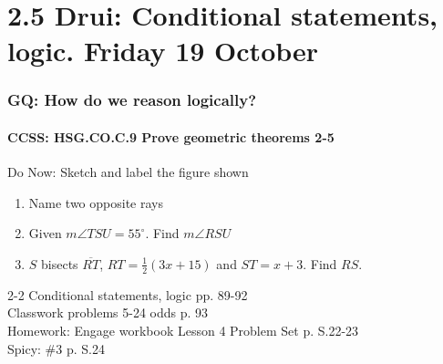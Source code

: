 \documentclass{beamer}
\begin{document}
\section{2.5 Drui: Conditional statements, logic. Friday 19 October}
  \frame
  {
    \frametitle{GQ: How do we reason logically?}
    \framesubtitle{CCSS: HSG.CO.C.9 Prove geometric theorems  \alert{2-5}}

    \begin{block}{Do Now: Sketch and label the figure shown}
      \begin{center}
      \end{center}
      \begin{enumerate}
      \item Name two opposite rays
      \item Given $m\angle TSU = 55^\circ$. Find $m\angle RSU$
      \item $S$ bisects $\overline{RT}$, $RT=\frac{1}{2} (3x+15)$ and $ST = x+3$. Find $RS$.
    \end{enumerate}
    \end{block}
    2-2 Conditional statements, logic  pp. 89-92\\
    Classwork problems 5-24 odds p. 93\\
    Homework: Engage workbook Lesson 4 Problem Set p. S.22-23 \\
    Spicy: \#3 p. S.24
  }
\end{document}
